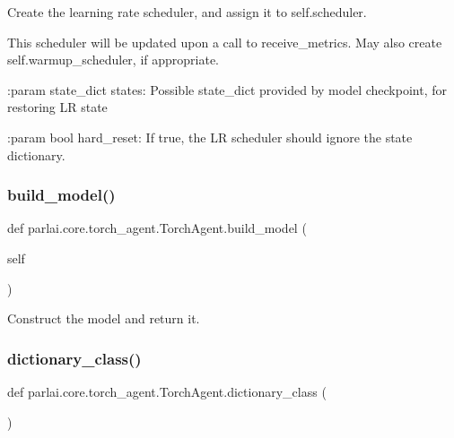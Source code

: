 \begin{DoxyVerb}Create the learning rate scheduler, and assign it to self.scheduler.

This scheduler will be updated upon a call to receive_metrics.
May also create self.warmup_scheduler, if appropriate.

:param state_dict states: Possible state_dict provided by model
    checkpoint, for restoring LR state

:param bool hard_reset: If true, the LR scheduler should ignore the
    state dictionary.
\end{DoxyVerb}
 \mbox{\label{classparlai_1_1core_1_1torch__agent_1_1TorchAgent_a9a21fa33fa5b2b928024fbc67826f233}} 
\subsubsection{\texorpdfstring{build\+\_\+model()}{build\_model()}}
{\footnotesize\ttfamily def parlai.\+core.\+torch\+\_\+agent.\+Torch\+Agent.\+build\+\_\+model (\begin{DoxyParamCaption}\item[{}]{self }\end{DoxyParamCaption})}

\begin{DoxyVerb}Construct the model and return it.
\end{DoxyVerb}
 \mbox{\label{classparlai_1_1core_1_1torch__agent_1_1TorchAgent_aea8849fa69a3f5dbd3216c8b06f180ea}} 
\subsubsection{\texorpdfstring{dictionary\+\_\+class()}{dictionary\_class()}}
{\footnotesize\ttfamily def parlai.\+core.\+torch\+\_\+agent.\+Torch\+Agent.\+dictionary\+\_\+class (\begin{DoxyParamCaption}{ }\end{DoxyParamCaption})\hspace{0.3cm}{\ttfamily [static]}}

